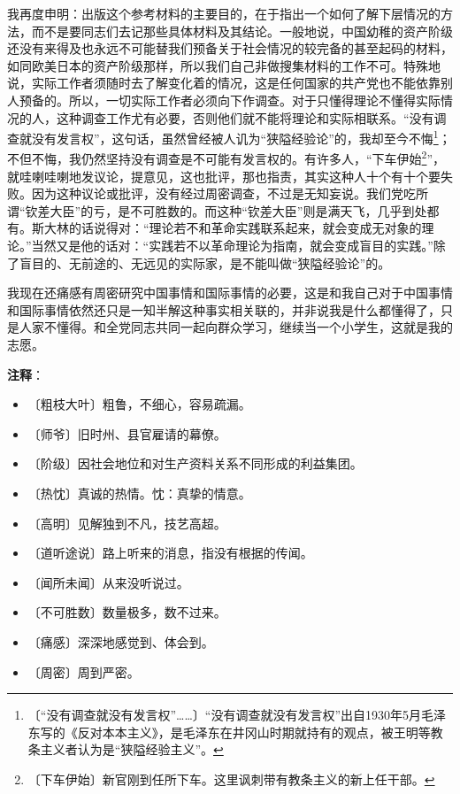 \documentclass[12pt,UTF-8,openany]{ctexbook}
\begin{document}
\begin{normalsize}
    我再度申明：出版这个参考材料的主要目的，在于指出一个如何了解下层情况的方法，而不是要同志们去记那些具体材料及其结论。一般地说，中国幼稚的资产阶级还没有来得及也永远不可能替我们预备关于社会情况的较完备的甚至起码的材料，如同欧美日本的资产阶级那样，所以我们自己非做搜集材料的工作不可。特殊地说，实际工作者须随时去了解变化着的情况，这是任何国家的共产党也不能依靠别人预备的。所以，一切实际工作者必须向下作调查。对于只懂得理论不懂得实际情况的人，这种调查工作尤有必要，否则他们就不能将理论和实际相联系。“没有调查就没有发言权”，这句话，虽然曾经被人讥为“狭隘经验论”的，我却至今不悔\footnote{〔“没有调查就没有发言权”……〕“没有调查就没有发言权”出自1930年5月毛泽东写的《反对本本主义》，是毛泽东在井冈山时期就持有的观点，被王明等教条主义者认为是“狭隘经验主义”。}；不但不悔，我仍然坚持没有调查是不可能有发言权的。有许多人，“下车伊始\footnote{〔下车伊始〕新官刚到任所下车。这里讽刺带有教条主义的新上任干部。}”，就哇喇哇喇地发议论，提意见，这也批评，那也指责，其实这种人十个有十个要失败。因为这种议论或批评，没有经过周密调查，不过是无知妄说。我们党吃所谓“钦差大臣”的亏，是不可胜数的。而这种“钦差大臣”则是满天飞，几乎到处都有。斯大林的话说得对：“理论若不和革命实践联系起来，就会变成无对象的理论。”当然又是他的话对：“实践若不以革命理论为指南，就会变成盲目的实践。”除了盲目的、无前途的、无远见的实际家，是不能叫做“狭隘经验论”的。
    
    我现在还痛感有周密研究中国事情和国际事情的必要，这是和我自己对于中国事情和国际事情依然还只是一知半解这种事实相关联的，并非说我是什么都懂得了，只是人家不懂得。和全党同志共同一起向群众学习，继续当一个小学生，这就是我的志愿。
    
\end{normalsize}


\newpage

\textbf{注释}：

\vspace{-1em}

\begin{itemize}
    \setlength\itemsep{-0.2em}
    \item 〔粗枝大叶〕粗鲁，不细心，容易疏漏。
    \item 〔师爷〕旧时州、县官雇请的幕僚。
    \item 〔阶级〕因社会地位和对生产资料关系不同形成的利益集团。
    \item 〔热忱〕真诚的热情。忱：真挚的情意。
    \item 〔高明〕见解独到不凡，技艺高超。
    \item 〔道听途说〕路上听来的消息，指没有根据的传闻。
    \item 〔闻所未闻〕从来没听说过。
    \item 〔不可胜数〕数量极多，数不过来。
    \item 〔痛感〕深深地感觉到、体会到。
    \item 〔周密〕周到严密。
\end{itemize}
\end{document}
